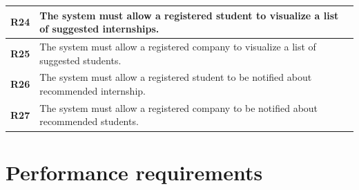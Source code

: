 \begin{table}[H]
\begin{tabular}{|l|m{10cm}|}
        \hline \textbf{R24} & The system must allow a registered student to visualize a list of suggested internships. \\
        \hline \textbf{R25} & The system must allow a registered company to visualize a list of suggested students. \\
        \hline \textbf{R26} & The system must allow a registered student to be notified about recommended internship. \\
        \hline \textbf{R27} & The system must allow a registered company to be notified about recommended students. \\
        \hline
    \end{tabular}
\end{table}

\section{Performance requirements}

